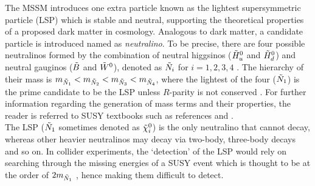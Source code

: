 The MSSM introduces one extra particle known as the lightest supersymmetric particle (LSP) which is stable and neutral, supporting the theoretical properties of a proposed dark matter in cosmology. Analogous to dark matter, a candidate particle is introduced named as \textit{neutralino}. To be precise, there are four possible neutralinos formed by the combination of neutral higgsinos ($\Tilde{H}_u^0$ and $ \Tilde{H}_d^0 $) and neutral gauginos ($\Tilde{B}$ and $\Tilde{W}^0$), denoted as $\Tilde{N}_i$ for $i=1,2,3,4$ \cite{martin1997supersymmetry}. The hierarchy of their mass is $ m_{\Tilde{N}_1} < m_{\Tilde{N}_2} < m_{\Tilde{N}_3} < m_{\Tilde{N}_4}$, where the lightest of the four ($\Tilde{N}_1$) is the prime candidate to be the LSP unless $R$-parity is not conserved \cite{martin1997supersymmetry}. For further information regarding the generation of mass terms and their properties, the reader is referred to SUSY textbooks such as references \cite{martin1997supersymmetry} and \cite{baer2006weak}. \\

The LSP ($\Tilde{N}_1$ sometimes denoted as $\Tilde{\chi}_i^0$) is the only neutralino that cannot decay, whereas other heavier neutralinos may decay via two-body, three-body decays and so on. In collider experiments, the `detection' of the LSP would rely on searching through the missing energies of a SUSY event which is thought to be at the order of $ 2m_{\Tilde{N}_1}$ \cite{aitchison2007supersymmetry}, hence making them difficult to detect.  \\
